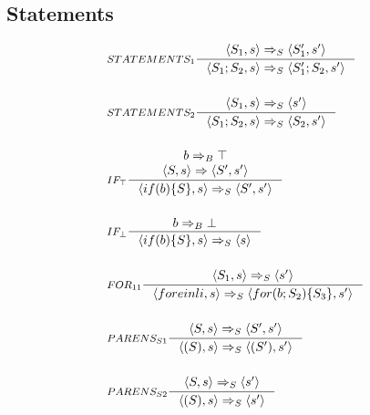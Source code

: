 \subsection{Statements}
\begin{align*}
&\inference[$STATEMENTS_1$]{\Braket{S_1,s} \Rightarrow_S \Braket{S_1',s'}}
                         {\Braket{S_1 ; S_2, s} \Rightarrow_S \Braket{S_1' ; S_2, s'}}
\\\\
&\inference[$STATEMENTS_2$]{\Braket{S_1,s} \Rightarrow_S \Braket{s'}}
                         {\Braket{S_1 ; S_2, s} \Rightarrow_S \Braket{S_2, s'}}
\\\\
&\inference[$IF_\top$]{b \Rightarrow_B \top \\ \Braket{S, s} \Rightarrow \Braket{S', s'}}
                      {\Braket{if(b)\{S\}, s} \Rightarrow_S \Braket{S', s'}}
\\\\
&\inference[$IF_\bot$]{b \Rightarrow_B \bot}
                      {\Braket{if(b)\{S\}, s} \Rightarrow_S \Braket{s}}
\\\\
&\inference[$FOR_{11}$]{\Braket{S_1,s} \Rightarrow_S \Braket{s'}}
                       {\Braket{for e in li, s} \Rightarrow_S \Braket{for(b;S_2)\{S_3\}, s'}}
\\\\
&\inference[$PARENS_{S1}$]{\Braket{S,s} \Rightarrow_S \Braket{S',s'}}
                       {\Braket{(S), s} \Rightarrow_S \Braket{(S'), s'}}
\\\\
&\inference[$PARENS_{S2}$]{\Braket{S,s} \Rightarrow_S \Braket{s'}}
                       {\Braket{(S), s} \Rightarrow_S \Braket{s'}}
\end{align*}